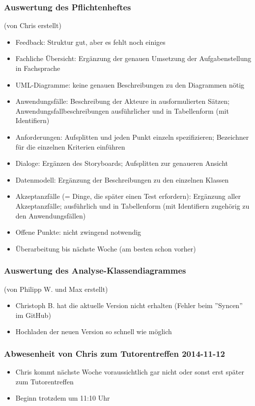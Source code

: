 \documentclass[12pt,a4paper]{article}
\begin{document}
\subsubsection*{Auswertung des Pflichtenheftes}
(von Chris erstellt)
\begin{itemize}
\item Feedback: Struktur gut, aber es fehlt noch einiges
\item Fachliche Übersicht: Ergänzung der genauen Umsetzung der Aufgabenstellung in Fachsprache
\item UML-Diagramme: keine genauen Beschreibungen zu den Diagrammen nötig
\item Anwendungsfälle: Beschreibung der Akteure in ausformulierten Sätzen; Anwendungsfallbeschreibungen ausführlicher und in Tabellenform (mit Identifiern)
\item Anforderungen: Aufsplitten und jeden Punkt einzeln spezifizieren; Bezeichner für die einzelnen Kriterien einführen
\item Dialoge: Ergänzen des Storyboards; Aufsplitten zur genaueren Ansicht
\item Datenmodell: Ergänzung der Beschreibungen zu den einzelnen Klassen
\item Akzeptanzfälle (= Dinge, die später einen Test erfordern): Ergänzung aller Akzeptanzfälle; ausführlich und in Tabellenform (mit Identifiern zugehörig zu den Anwendungsfällen)
\item Offene Punkte: nicht zwingend notwendig
\item Überarbeitung bis nächste Woche (am besten schon vorher)
\end{itemize}

\subsubsection*{Auswertung des Analyse-Klassendiagrammes}
(von Philipp W. und Max erstellt)
\begin{itemize}
\item Christoph B. hat die aktuelle Version nicht erhalten (Fehler beim ''Syncen'' im GitHub)
\item Hochladen der neuen Version so schnell wie möglich
\end{itemize}

\subsubsection*{Abwesenheit von Chris zum Tutorentreffen 2014-11-12}
\begin{itemize}
\item Chris kommt nächste Woche voraussichtlich gar nicht oder sonst erst später zum Tutorentreffen
\item Beginn trotzdem um 11:10 Uhr
\end{itemize}
\end{document}
